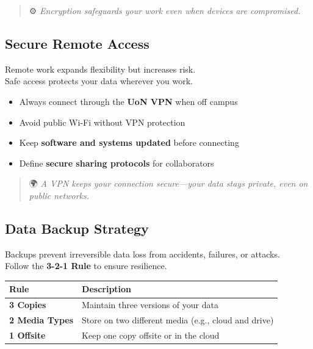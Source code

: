 \documentclass[
  letterpaper,
  DIV=11,
  numbers=noendperiod]{scrartcl}
\providecommand{\tightlist}{%
  \setlength{\itemsep}{0pt}\setlength{\parskip}{0pt}}
\begin{document}
\begin{quote}
⚙️ \emph{Encryption safeguards your work even when devices are
compromised.}
\end{quote}

\subsection{Secure Remote Access}\label{secure-remote-access}

Remote work expands flexibility but increases risk.\\
Safe access protects your data wherever you work.

\begin{itemize}
\tightlist
\item
  Always connect through the \textbf{UoN VPN} when off campus\\
\item
  Avoid public Wi-Fi without VPN protection\\
\item
  Keep \textbf{software and systems updated} before connecting\\
\item
  Define \textbf{secure sharing protocols} for collaborators
\end{itemize}

\begin{quote}
🌍 \emph{A VPN keeps your connection secure---your data stays private,
even on public networks.}
\end{quote}

\subsection{Data Backup Strategy}\label{data-backup-strategy}

Backups prevent irreversible data loss from accidents, failures, or
attacks.\\
Follow the \textbf{3-2-1 Rule} to ensure resilience.

\begin{longtable}[]{@{}
  >{\raggedright\arraybackslash}p{}
  >{\raggedright\arraybackslash}p{}@{}}
\toprule\noalign{}
\begin{minipage}[b]{\linewidth}\raggedright
\textbf{Rule}
\end{minipage} & \begin{minipage}[b]{\linewidth}\raggedright
\textbf{Description}
\end{minipage} \\
\midrule\noalign{}
\endhead
\bottomrule\noalign{}
\endlastfoot
\textbf{3 Copies} & Maintain three versions of your data \\
\textbf{2 Media Types} & Store on two different media (e.g., cloud and
drive) \\
\textbf{1 Offsite} & Keep one copy offsite or in the cloud \\
\end{longtable}
\end{document}
